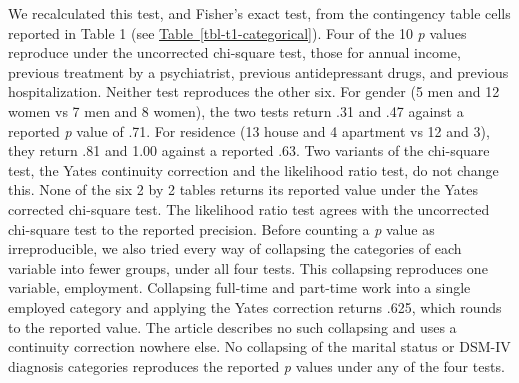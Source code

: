 \documentclass[
  letterpaper,
  DIV=11,
  numbers=noendperiod]{scrartcl}
\begin{document}
We recalculated this test, and Fisher's exact test, from the contingency
table cells reported in Table 1 (see
\hyperref[tbl-t1-categorical]{Table~\ref*{tbl-t1-categorical}}). Four of
the 10 \emph{p} values reproduce under the uncorrected chi-square test,
those for annual income, previous treatment by a psychiatrist, previous
antidepressant drugs, and previous hospitalization. Neither test
reproduces the other six. For gender (5 men and 12 women vs 7 men and 8
women), the two tests return .31 and .47 against a reported \emph{p}
value of .71. For residence (13 house and 4 apartment vs 12 and 3), they
return .81 and 1.00 against a reported .63. Two variants of the
chi-square test, the Yates continuity correction and the likelihood
ratio test, do not change this. None of the six 2 by 2 tables returns
its reported value under the Yates corrected chi-square test. The
likelihood ratio test agrees with the uncorrected chi-square test to the
reported precision. Before counting a \emph{p} value as irreproducible,
we also tried every way of collapsing the categories of each variable
into fewer groups, under all four tests. This collapsing reproduces one
variable, employment. Collapsing full-time and part-time work into a
single employed category and applying the Yates correction returns .625,
which rounds to the reported value. The article describes no such
collapsing and uses a continuity correction nowhere else. No collapsing
of the marital status or DSM-IV diagnosis categories reproduces the
reported \emph{p} values under any of the four tests.
\end{document}
